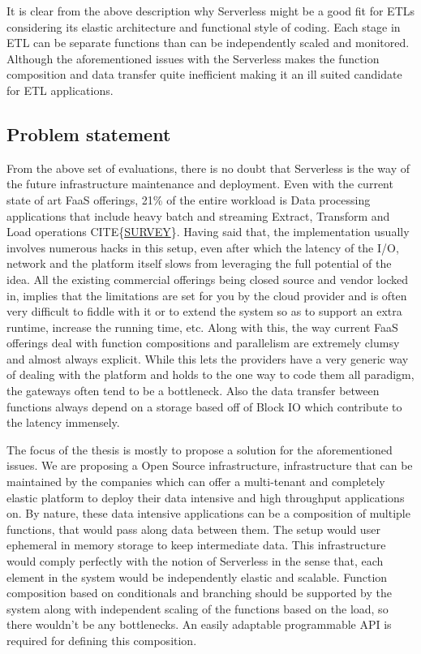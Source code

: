 \documentclass[12pt,titlepage]{article}
\begin{document}
It is clear from the above description why Serverless might be a good fit for
ETLs considering its elastic architecture and functional style of coding. Each
stage in ETL can be separate functions than can be independently scaled and
monitored. Although the aforementioned issues with the Serverless makes the
function composition and data transfer quite inefficient making it an ill suited
candidate for ETL applications.

\subsection{Problem statement}
\label{sec:org3c79be3}
From the above set of evaluations, there is no doubt that Serverless is the way
of the future infrastructure maintenance and deployment. Even with the current
state of art FaaS offerings, 21\% of the entire workload is Data processing
applications that include heavy batch and streaming Extract, Transform and Load
operations CITE\{\href{https://www.serverless.com/blog/2018-serverless-community-survey-huge-growth-usage/}{SURVEY}\}. Having said that, the implementation usually involves
numerous hacks in this setup, even after which the latency of the I/O, network
and the platform itself slows from leveraging the full potential of the idea.
All the existing commercial offerings being closed source and vendor locked in,  
implies that the limitations are set for you by
the cloud provider and is often very difficult to fiddle with it or to extend
the system so as to support an extra runtime, increase the running time, etc.
Along with this, the way current FaaS offerings deal with function compositions
and parallelism are extremely clumsy and almost always explicit. While this lets
the providers have a very generic way of dealing with the platform and holds to
the one way to code them all paradigm, the gateways often tend to be a
bottleneck. Also the data transfer between functions always depend on a storage
based off of Block IO which contribute to the latency immensely.

The focus of the thesis is mostly to propose a solution for the aforementioned
issues. We are proposing a Open Source infrastructure, infrastructure that can
be maintained by the companies which can offer a multi-tenant and completely elastic
platform to deploy their data intensive and high throughput applications on.
By nature, these data intensive applications can be a composition of multiple
functions, that would pass along data between them. The setup would user
ephemeral in memory storage to keep intermediate data. This infrastructure
would comply perfectly with the notion of Serverless in the sense that, each
element in the system would be independently elastic and scalable. Function
composition based on conditionals and branching should be supported by the
system along with independent scaling of the functions based on the load, so
there wouldn't be any bottlenecks. An easily adaptable programmable API is
required for defining this composition.
\end{document}
